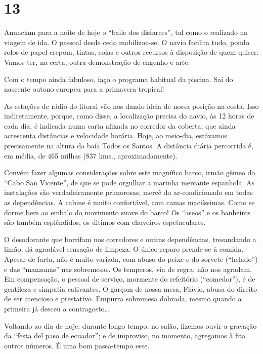 \section*{13 \adfflatleafright {}}
Anunciam para a noite de hoje o ``baile dos disfarces'', tal como o realizado na viagem de ida. O pessoal desde cedo mobilizou-se. O navio facilita tudo, pondo rolos de papel crepom, tintas, colas e outros recursos à disposição de quem quiser. Vamos ter, na certa, outra demonstração de engenho e arte.

Com o tempo ainda fabuloso, faço o programa habitual da piscina. Saí do nascente outono europeu para a primavera tropical!

As estações de rádio do litoral vão nos dando ideia de nossa posição na costa. Isso indiretamente, porque, como disse, a localização precisa do navio, às 12 horas de cada dia, é indicada numa carta afixada no corredor da coberta, que ainda acrescenta distâncias e velocidade horária. Hoje, ao meio-dia, estávamos precisamente na altura da baía Todos os Santos. A distância diária percorrida é, em média, de 465 milhas (837 kms., aproximadamente).

Convém fazer algumas considerações sobre este magnífico barco, irmão gêmeo do ``Cabo San Vicente'', de que se pode orgulhar a marinha mercante espanhola. As instalações são verdadeiramente primorosas, mercê do ar-condicionado em todas as dependências. A cabine é muito confortável, com camas maciíssimas. Como se dorme bem ao embalo do movimento suave do barco! Os ``aseos'' e os banheiros são também esplêndidos, os últimos com chuveiros espetaculares.

O desodorante que borrifam nos corredores e outras dependências, tresandando a limão, dá agradável sensação de limpeza. O único reparo prende-se à comida. Apesar de farta, não é muito variada, com abuso do peixe e do sorvete (``helado'') e das ``manzanas'' nas sobremesas. Os temperos, via de regra, não nos agradam. Em compensação, o pessoal de serviço, mormente do refeitório (``comedor''), é de gentileza e simpatia cativantes. O garçom de nossa mesa, Flávio, abusa do direito de ser atencioso e prestativo. Empurra sobremesa dobrada, mesmo quando a primeira já desceu a contragosto\ldots

Voltando ao dia de hoje: durante longo tempo, no salão, fizemos ouvir a gravação da ``festa del paso de ecuador''; e de improviso, no momento, agregamos à fita outros números. É uma bom passa-tempo esse.

